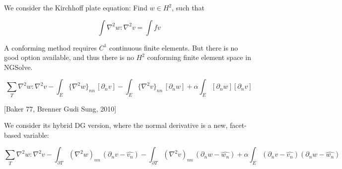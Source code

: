 We consider the Kirchhoff plate equation: Find $w \in H^2$, such that

$$
\int \nabla^2 w : \nabla^2 v = \int f v
$$

A conforming method requires $C^1$ continuous finite elements. But there is no good option available, and thus there is no $H^2$ conforming finite element space in NGSolve.

$$
\sum_T \nabla^2 w : \nabla^2 v
- \int_{E} \{\nabla^2 w\}_{nn} \, [\partial_n v]
- \int_{E} \{\nabla^2 v\}_{nn} \, [\partial_n w] + \alpha \int_E  [\partial_n w]  [\partial_n v]
$$

[Baker 77, Brenner Gudi Sung, 2010]

We consider its hybrid DG version, where the normal derivative is a new, facet-based variable:


$$
\sum_T \nabla^2 w : \nabla^2 v
- \int_{\partial T} (\nabla^2 w)_{nn} \, (\partial_n v - \widehat{v_n})
- \int_{\partial T} (\nabla^2 v)_{nn} \, (\partial_n w - \widehat{w_n}) + \alpha \int_E (\partial_n v - \widehat{v_n}) (\partial_n w - \widehat{w_n})
$$




